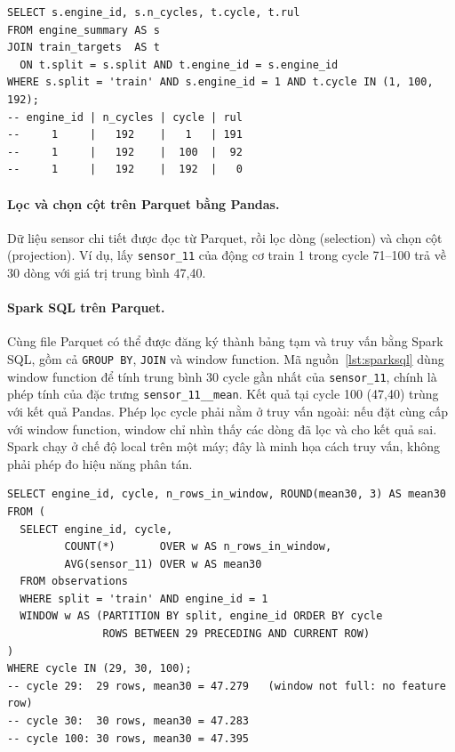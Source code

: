 \begin{lstlisting}[language=SparkSQL,caption={Truy vấn SQLite \texttt{outputs/etl/gold/etl.sqlite}.},label={lst:sqlite}]
SELECT s.engine_id, s.n_cycles, t.cycle, t.rul
FROM engine_summary AS s
JOIN train_targets  AS t
  ON t.split = s.split AND t.engine_id = s.engine_id
WHERE s.split = 'train' AND s.engine_id = 1 AND t.cycle IN (1, 100, 192);
-- engine_id | n_cycles | cycle | rul
--     1     |   192    |   1   | 191
--     1     |   192    |  100  |  92
--     1     |   192    |  192  |   0
\end{lstlisting}

\paragraph{Lọc và chọn cột trên Parquet bằng Pandas.} Dữ liệu sensor chi tiết được
đọc từ Parquet, rồi lọc dòng (selection) và chọn cột (projection). Ví dụ, lấy
\texttt{sensor\_11} của động cơ train 1 trong cycle 71--100 trả về 30 dòng với giá
trị trung bình 47,40.

\paragraph{Spark SQL trên Parquet.} Cùng file Parquet có thể được đăng ký thành
bảng tạm và truy vấn bằng Spark SQL, gồm cả \texttt{GROUP BY}, \texttt{JOIN} và
window function. Mã nguồn~\ref{lst:sparksql} dùng window function để tính trung
bình 30 cycle gần nhất của \texttt{sensor\_11}, chính là phép tính của đặc trưng
\texttt{sensor\_11\_\_mean}. Kết quả tại cycle 100 (47,40) trùng với kết quả
Pandas. Phép lọc cycle phải nằm ở truy vấn ngoài: nếu đặt cùng cấp với window
function, window chỉ nhìn thấy các dòng đã lọc và cho kết quả sai. Spark chạy ở
chế độ local trên một máy; đây là minh họa cách truy vấn, không phải phép đo hiệu
năng phân tán.

\begin{lstlisting}[language=SparkSQL,caption={Spark SQL trên \texttt{observations.parquet}: trung bình 30 cycle gần nhất.},label={lst:sparksql}]
SELECT engine_id, cycle, n_rows_in_window, ROUND(mean30, 3) AS mean30
FROM (
  SELECT engine_id, cycle,
         COUNT(*)       OVER w AS n_rows_in_window,
         AVG(sensor_11) OVER w AS mean30
  FROM observations
  WHERE split = 'train' AND engine_id = 1
  WINDOW w AS (PARTITION BY split, engine_id ORDER BY cycle
               ROWS BETWEEN 29 PRECEDING AND CURRENT ROW)
)
WHERE cycle IN (29, 30, 100);
-- cycle 29:  29 rows, mean30 = 47.279   (window not full: no feature row)
-- cycle 30:  30 rows, mean30 = 47.283
-- cycle 100: 30 rows, mean30 = 47.395
\end{lstlisting}

